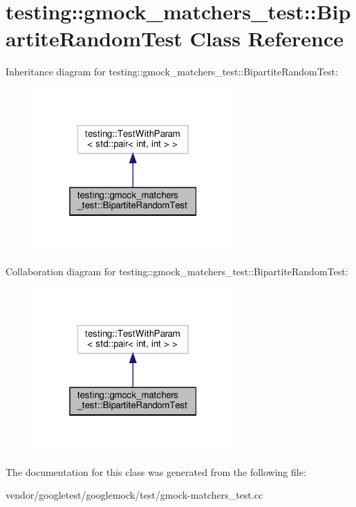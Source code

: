 \hypertarget{classtesting_1_1gmock__matchers__test_1_1_bipartite_random_test}{}\section{testing\+:\+:gmock\+\_\+matchers\+\_\+test\+:\+:Bipartite\+Random\+Test Class Reference}
\label{classtesting_1_1gmock__matchers__test_1_1_bipartite_random_test}


Inheritance diagram for testing\+:\+:gmock\+\_\+matchers\+\_\+test\+:\+:Bipartite\+Random\+Test\+:
\nopagebreak
\begin{figure}[H]
\begin{center}
\leavevmode
\includegraphics[width=217pt]{classtesting_1_1gmock__matchers__test_1_1_bipartite_random_test__inherit__graph}
\end{center}
\end{figure}


Collaboration diagram for testing\+:\+:gmock\+\_\+matchers\+\_\+test\+:\+:Bipartite\+Random\+Test\+:
\nopagebreak
\begin{figure}[H]
\begin{center}
\leavevmode
\includegraphics[width=217pt]{classtesting_1_1gmock__matchers__test_1_1_bipartite_random_test__coll__graph}
\end{center}
\end{figure}


The documentation for this class was generated from the following file\+:\begin{DoxyCompactItemize}
\item 
vendor/googletest/googlemock/test/gmock-\/matchers\+\_\+test.\+cc\end{DoxyCompactItemize}
